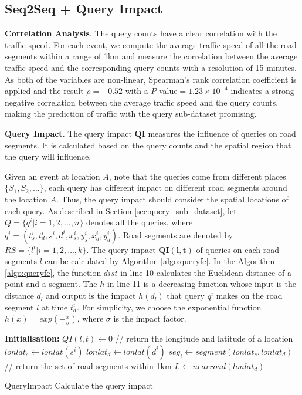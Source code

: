 \subsection{Seq2Seq + Query Impact}

\textbf{Correlation Analysis}. The query counts have a clear correlation with the traffic speed. For each event, we compute the average traffic speed of all the road segments within a range of 1km and measure the correlation between the average traffic speed and the corresponding query counts with a resolution of 15 minutes. As both of the variables are non-linear, Spearman's rank correlation coefficient is applied and the result $\rho=-0.52$ with a $P$-value$=1.23 \times 10^{-4}$ indicates a strong negative correlation between the average traffic speed and the query counts, making the prediction of traffic with the query sub-dataset promising.

\textbf{Query Impact}. The query impact $\bm{QI}$ measures the influence of queries on road segments. It is calculated based on the query counts and the spatial region that the query will influence. 

Given an event at location $A$, note that the queries come from different places $\{S_1, S_2, ...\}$, each query has different impact on different road segments around the location $A$. Thus, the query impact should consider the spatial locations of each query. As described in Section \ref{sec:query_sub_dataset}, let $Q=\{q^i|i = 1, 2, \dots, n\}$ denotes all the queries, where $q^i= (t_s^i, t_d^i, s^i, d^i, x_s^i, y_s^i, x_d^i, y_d^i)$. Road segments are denoted by $RS=\{l^i | i=1, 2, \dots, k\}$. The query impact $\bm{QI (l, t)}$ of queries on each road segments $l$ can be calculated by Algorithm \ref{algo:queryfe}. In the Algorithm \ref{algo:queryfe}, the function $dist$ in line 10 calculates the Euclidean distance of a point and a segment. The $h$ in line 11 is a decreasing function whose input is the distance $d_l$ and output is the impact $h (d_l)$ that query $q^i$ makes on the road segment $l$ at time $t_d^i$. For simplicity, we choose the exponential function $h (x)=exp (-\frac{x}{\sigma})$, where $\sigma$ is the impact factor.

\begin{algorithm}
\DontPrintSemicolon {}
\textbf{Initialisation:} $QI (l, t) \gets 0$ \;
 {
  // return the longitude and latitude of a location \;
  $lonlat_s \gets lonlat (s^i)$ \;
  $lonlat_d \gets lonlat (d^i)$\;
  $seg_i \gets segment (lonlat_s, lonlat_d)$\;
  // return the set of road segments within 1km
  $L \gets nearroad (lonlat_d)$\;
}
\;
\caption{{\sc QueryImpact} Calculate the query impact}
\label{algo:queryfe}
\end{algorithm}

